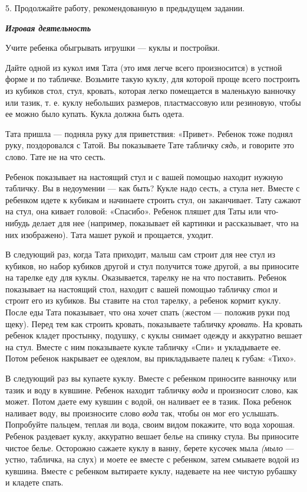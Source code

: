 \documentclass{book}
\renewcommand{\emph}[1]{\textit{#1}}
\begin{document}
5. Продолжайте работу, рекомендованную в предыдущем задании.

\emph{\textbf{Игровая деятельность}}

Учите ребенка обыгрывать игрушки --- куклы и постройки.

Дайте одной из кукол имя Тата (это имя легче всего произносится) в
устной форме и по табличке. Возьмите такую куклу, для которой проще
всего построить из кубиков стол, стул, кровать, которая легко помещается
в маленькую ванночку или тазик, т. е. куклу небольших размеров,
пластмассовую или резиновую, чтобы ее можно было купать. Кукла должна
быть одета.

Тата пришла --- подняла руку для приветствия: «Привет». Ребенок тоже
поднял руку, поздоровался с Татой. Вы показываете Тате табличку
\emph{сядь,} и говорите это слово. Тате не на что сесть.

Ребенок показывает на настоящий стул и с вашей помощью находит нужную
табличку. Вы в недоумении --- как быть? Кукле надо сесть, а стула нет.
Вместе с ребенком идете к кубикам и начинаете строить стул, он
заканчивает. Тату сажают на стул, она кивает головой: «Спасибо». Ребенок
пляшет для Таты или что-нибудь делает для нее (например, показывает ей
картинки и рассказывает, что на них изображено). Тата машет рукой и
прощается, уходит.

В следующий раз, когда Тата приходит, малыш сам строит для нее стул из
кубиков, но набор кубиков другой и стул получится тоже другой, а вы
приносите на тарелке еду для куклы. Оказывается, тарелку не на что
поставить. Ребенок показывает на настоящий стол, находит с вашей помощью
табличку \emph{стол} и строит его из кубиков. Вы ставите на стол
тарелку, а ребенок кормит куклу. После еды Тата показывает, что она
хочет спать (жестом --- положив руки под щеку). Перед тем как строить
кровать, показываете табличку \emph{кровать.} На кровать ребенок кладет
простынку, подушку, с куклы снимает одежду и аккуратно вешает на стул.
Вместе с ним показываете кукле табличку «Спи» и укладываете ее. Потом
ребенок накрывает ее одеялом, вы прикладываете палец к губам: «Тихо».

В следующий раз вы купаете куклу. Вместе с ребенком приносите ванночку
или тазик и воду в кувшине. Ребенок находит табличку \emph{вода} и
произносит слово, как может. Потом даете ему кувшин с водой, он наливает
ее в тазик. Пока ребенок наливает воду, вы произносите слово \emph{вода}
так, чтобы он мог его услышать. Попробуйте пальцем, теплая ли вода,
своим видом покажите, что вода хорошая. Ребенок раздевает куклу,
аккуратно вешает белье на спинку стула. Вы приносите чистое белье.
Осторожно сажаете куклу в ванну, берете кусочек мыла \emph{(мыло} ---
устно, табличка, на слух) и моете ее вместе с ребенком, затем смываете
водой из кувшина. Вместе с ребенком вытираете куклу, надеваете на нее
чистую рубашку и кладете спать.
\end{document}

